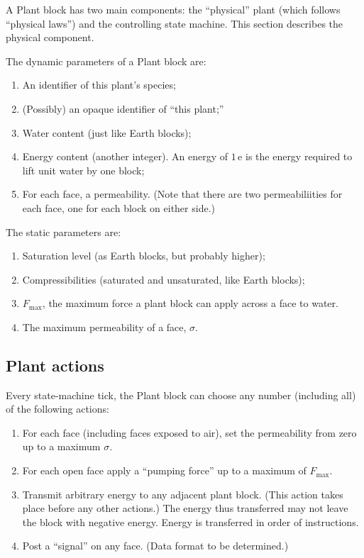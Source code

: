 \documentclass[10pt, a4paper, twocolumn]{article}
\begin{document}
A Plant block has two main components: the ``physical'' plant (which
follows ``physical laws'') and the controlling state machine. This
section describes the physical component.

The dynamic parameters of a Plant block are:
\begin{enumerate}
\item An identifier of this plant's species;
\item (Possibly) an opaque identifier of ``this plant;'' 
\item Water content (just like Earth blocks);
\item Energy content (another integer). An energy of $1\,\textrm{e}$ is the energy
  required to lift unit water by one block;
\item For each face, a permeability. (Note that there are two
  permeabiliities for each face, one for each block on either side.)
\end{enumerate}

The static parameters are:
\begin{enumerate}
\item Saturation level (as Earth blocks, but probably higher);
\item Compressibilities (saturated and unsaturated, like Earth
  blocks);
\item $F_{\text{max}}$, the maximum force a plant block can apply
  across a face to water.
\item The maximum permeability of a face, $\sigma$.
\end{enumerate}

\subsection{Plant actions}

Every state-machine tick, the Plant block can choose any number
(including all) of the
following actions:

\begin{enumerate}
\item For each face (including faces exposed to air), set the
  permeability from zero up to a maximum $\sigma$.
\item For each open face apply a ``pumping force'' up to a maximum of
  $F_{\text{max}}$.
\item Transmit arbitrary energy to any adjacent plant block. (This
  action takes place before any other actions.) The energy thus
  transferred may not leave the block with negative energy. Energy is
  transferred in order of instructions.
\item Post a ``signal'' on any face. (Data format to be determined.)
\end{enumerate}
\end{document}
